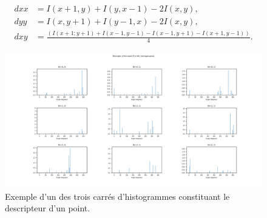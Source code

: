 \documentclass[
	a4paper, %
	10pt, %
	unnumberedsections, %
	twoside, %
]{LTJournalArticle}
\begin{document}
\begin{equation} \label{eq:hess_coefs}
	\begin{split}
		dxx & = I(x+1, y) + I(y, x-1) - 2I(x, y),                                              \\
		dyy & = I(x, y+1) + I(y-1, x) - 2I(x, y),                                              \\
		dxy & = \frac{\left(I(x+1; y+1) + I(x-1, y-1) - I(x-1, y+1) - I(x+1, y-1) \right)}{4}.
	\end{split}
\end{equation}

\begin{figure}[H]
	\centering
	\includegraphics[width=\textwidth]{images/histo_result.png}
	\caption{Exemple d'un des trois carrés d'histogrammes constituant le descripteur
		d'un point.}
	\label{figure:fig_hist}
\end{figure}

\clearpage
\end{document}
